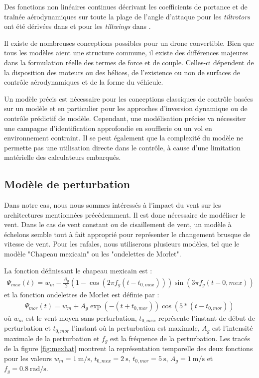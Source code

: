 Des fonctions non linéaires continues décrivant les coefficients de portance et de traînée aérodynamiques sur toute la plage de l'angle d'attaque pour les  \textit{tiltrotors} ont été dérivées dans \cite{6981467} et pour les \textit{tiltwings} dans \cite{Lustosa2017LaP, lustosaHal-03035938}.

Il existe de nombreuses conceptions possibles pour un drone convertible. Bien que tous les modèles aient une structure commune, il existe des différences majeures dans la formulation réelle des termes de force et de couple. Celles-ci dépendent de la disposition des moteurs ou des hélices, de l'existence ou non de surfaces de contrôle aérodynamiques et de la forme du véhicule.

Un modèle précis est nécessaire pour les conceptions classiques de contrôle basées sur un modèle et en particulier pour les approches d'inversion dynamique ou de contrôle prédictif de modèle. Cependant, une modélisation précise va nécessiter une campagne d'identification approfondie en soufflerie ou un vol en environnement contraint. Il se peut également que la complexité du modèle ne permette pas une utilisation directe dans le contrôle, à cause d'une limitation matérielle des calculateurs embarqués.

\subsection{Modèle de perturbation}

Dans notre cas, nous nous sommes intéressés à l'impact du vent sur les architectures mentionnées précédemment. Il est donc nécessaire de modéliser le vent. Dans le cas de vent constant ou de cisaillement de vent, un modèle à échelons semble tout à fait approprié pour représenter le changement brusque de vitesse de vent. 
Pour les rafales, nous utiliserons plusieurs modèles, tel que le modèle "Chapeau mexicain" ou les "ondelettes de Morlet".

La fonction définissant le chapeau mexicain est :
\begin{align}
    \Psi_{mex}(t)= w_{m} - \frac{A_g}{2} \left(1-\cos(2 \pi f_g (t-t_{0,mex}))\right)\sin(3 \pi f_g (t-{0,mex}))
\end{align}
et la fonction ondelettes de Morlet est définie par :
\begin{align}
    \Psi_{mor}(t)=  w_{m} + A_g \exp(-(t+t_{0,mor})) \cos(5*(t-t_{0,mor}))
\end{align}
où $w_{m}$ est le vent moyen sans perturbation, $t_{0,mex}$ représente l'instant de début de perturbation et $t_{0,mor}$ l'instant où la perturbation est maximale, $A_g$ est l'intensité maximale de la perturbation et  $f_g$ est la fréquence de la perturbation. Les tracés de la figure \ref{fig:mexhat} montrent la représentation temporelle des deux fonctions pour les valeurs $w_{m} = \SI{1}{\meter\per\second}$, $t_{0,mex} = \SI{2}{\second}$,  $t_{0,mor} = \SI{5}{\second}$, $A_g = \SI{1}{\meter\per\second}$ et $f_g = \SI{0.8}{\radian\per\second}$.


